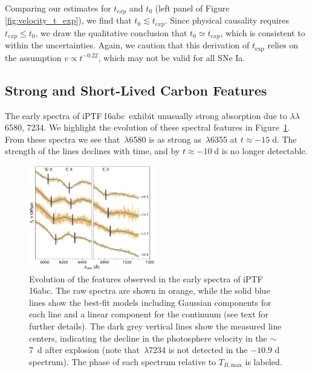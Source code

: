 \documentclass[twocolumn]{aastex61}
\newcommand{\abc}{iPTF\,16abc}
\newcommand{\ycao}[1]{{\color{red} ycao: {#1}}}
\begin{document}
Comparing our estimates for $t_{exp}$ and $t_0$ (left panel of 
Figure \ref{fig:velocity_t_exp}), we find that 
$t_0\lesssim t_{exp}$.
Since physical causality requires $t_{exp} \le t_0$, we draw the qualitative
conclusion that $t_0\simeq t_{exp}$, which is consistent to within the uncertainties. Again, we caution that this derivation of $t_\mathrm{exp}$ relies on the assumption $v \propto t^{-0.22}$, which may not be valid for all SNe Ia.  


\subsection{Strong and Short-Lived Carbon Features}
\label{sec:carbon}

The early spectra of \abc\ exhibit unusually strong absorption due 
to  $\lambda\lambda$6580, 7234. We highlight the evolution 
of these spectral features in Figure~\ref{fig:carbon}. From these 
spectra we see that \,$\lambda$6580 is as strong as 
\,$\lambda$6355 at $t \approx -15 \; \mathrm{d}$. The 
strength of the  lines declines with time, and by $t \approx -10 \; \mathrm{d}$  is no longer detectable.

\begin{figure}[]
  \centering
  \includegraphics[width=0.49\textwidth]{CarbonFeature.pdf}
  \caption{Evolution of the  features observed in the 
  early spectra of \abc. The raw spectra are shown in orange, while 
  the solid blue lines show the best-fit models including Gaussian 
  components for each line and a linear component for the continuum 
  (see text for further details). The dark grey vertical lines show 
  the measured line centers, indicating the decline in the 
  photosphere velocity in the $\sim$7~d after explosion (note that 
  \,$\lambda$7234 is not detected in the $-10.9$ d 
  spectrum). The phase of each spectrum relative to 
  $T_{B,\mathrm{max}}$ is labeled.
  }
  \label{fig:carbon}
\end{figure}
\end{document}
